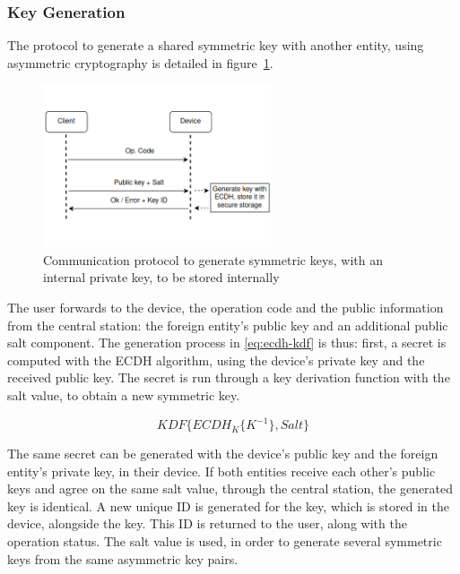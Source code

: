 \subsubsection{Key Generation}\label{chap:arch:services:new-comms:ecdh}

The protocol to generate a shared symmetric key with another entity, using asymmetric cryptography is detailed in figure~\ref{fig:protocol:ecdh}.
\begin{figure}[h!]
	\centering
	\includegraphics[width=0.60\textwidth]{./Images/ecdh.png}
	\caption{Communication protocol to generate symmetric keys, with an internal private key, to be stored internally}
	\label{fig:protocol:ecdh}
\end{figure}

The user forwards to the device, the operation code and the public information from the central station: the foreign entity's public key and an additional public salt component.
The generation process in \ref{eq:ecdh-kdf} is thus: first, a secret is computed with the ECDH algorithm, using the device's private key and the received public key. The secret is run through a key derivation function with the salt value, to obtain a new symmetric key.

\begin{equation}
	\label{eq:ecdh-kdf}
	KDF\{ECDH_{K}\{K^{-1}\}, Salt\}
\end{equation}

The same secret can be generated with the device's public key and the foreign entity's private key, in their device. If both entities receive each other's public keys and agree on the same salt value, through the central station, the generated key is identical.
A new unique ID is generated for the key, which is stored in the device, alongside the key. This ID is returned to the user, along with the operation status.
The salt value is used, in order to generate several symmetric keys from the same asymmetric key pairs.

